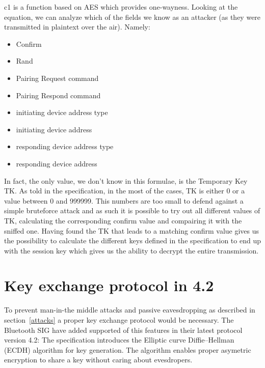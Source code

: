 \documentclass[conference]{IEEEtran}
\begin{document}
c1 is a function based on AES which provides one-wayness.
Looking at the equation, we can analyze which of the fields we know as an attacker (as they were transmitted in plaintext over the air). Namely:

\begin{itemize}
  \item Confirm
  \item Rand
  \item Pairing Request command
  \item Pairing Respond command
  \item initiating device address type
  \item initiating device address
  \item responding device address type
  \item responding device address
\end{itemize}

In fact, the only value, we don't know in this formulae, is the Temporary Key TK. As told in the specification, in the most of the cases, TK is either 0 or a value between 0 and 999999. This numbers are too small to defend against a simple bruteforce attack and as such it is possible to try out all different values of TK, calculating the corresponding confirm value and compairing it with the sniffed one. Having found the TK that leads to a matching confirm value gives us the possibility to calculate the different keys defined in the specification to end up with the session key which gives us the ability to decrypt the entire transmission.

\section{Key exchange protocol in 4.2}

To prevent man-in-the middle attacks and passive eavesdropping as described in section~\ref{attacks} a proper key exchange protocol would be necessary. The Bluetooth SIG have added supported of this features in their latest protocol version 4.2: The specification introduces the Elliptic curve Diffie–Hellman (ECDH) algorithm for key generation. The algorithm enables proper asymetric encryption to share a key without caring about evesdropers.


\end{document}
